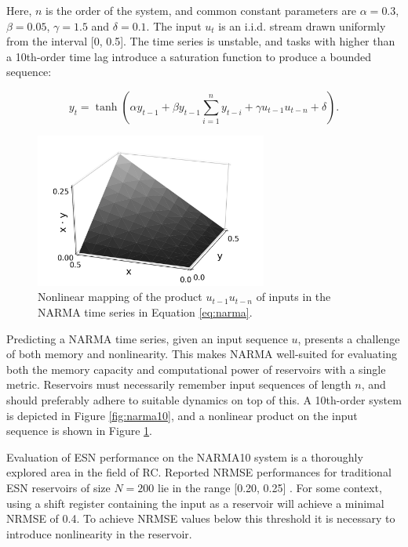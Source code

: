 Here, $n$ is the order of the system, and common constant parameters are $\alpha
= 0.3$, $\beta = 0.05$, $\gamma = 1.5$ and $\delta = 0.1$. The input $u_{t}$ is
an i.i.d. stream drawn uniformly from the interval [0, 0.5]. The time series is
unstable, and tasks with higher than a 10th-order time lag introduce a
saturation function to produce a bounded sequence:

\begin{equation}
  y_{t} =
  \tanh(
  \alpha y_{t-1} +
  \beta y_{t-1} \sum_{i=1}^{n}y_{t-i} +
  \gamma u_{t-1}u_{t-n} +
  \delta
  )
  .
  \label{eq:narma-tanh}
\end{equation}

\begin{figure}[t!]
  \centering
  \includegraphics[width=3.0in]{figures/NARMA-nonlinearity.png}
  \caption{
    Nonlinear mapping of the product $u_{t-1}u_{t-n}$ of inputs in the NARMA
time series in Equation \protect\ref{eq:narma}.
  }
  \label{fig:narma-nonlinearity}
\end{figure}

Predicting a NARMA time series, given an input sequence $u$, presents a
challenge of both memory and nonlinearity. This makes NARMA well-suited for
evaluating both the memory capacity and computational power of reservoirs with a
single metric. Reservoirs must necessarily remember input sequences of length
$n$, and should preferably adhere to suitable dynamics on top of this. A
10th-order system is depicted in Figure \ref{fig:narma10}, and a nonlinear
product on the input sequence is shown in Figure \ref{fig:narma-nonlinearity}.

Evaluation of ESN performance on the NARMA10 system is a thoroughly explored
area in the field of RC. Reported NRMSE performances for traditional ESN
reservoirs of size $N = 200$ lie in the range [0.20, 0.25]
\cite{verstraeten_experimental_2007, rodan_minimum_2011,
goudarzi_comparative_2014, jaeger_adaptive_2003}. For some context, using a
shift register containing the input as a reservoir will achieve a minimal NRMSE
of 0.4. To achieve NRMSE values below this threshold it is necessary to
introduce nonlinearity in the reservoir.

